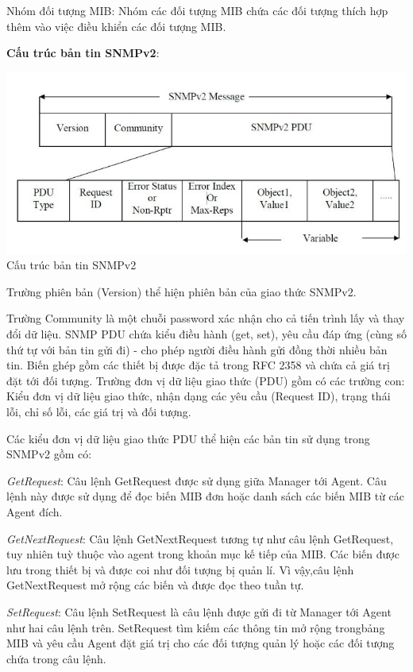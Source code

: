 \documentclass[12pt,oneside,a4paper,reqno]{report}
\begin{document}
\begin{large}
Nhóm đối tượng MIB: Nhóm các đối tượng MIB chứa các đối tượng thích hợp thêm vào việc điều khiển các đối tượng MIB. 

\newpage

\textbf{Cấu trúc bản tin SNMPv2}: 

\begin{center}
	\includegraphics[scale=0.7]{images/snmpv2.jpg}\\
	Cấu trúc bản tin SNMPv2
\end{center}

Trường phiên bản (Version) thể hiện phiên bản của giao thức SNMPv2. 

Trường Community là một chuỗi password xác nhận cho cả tiến trình lấy và thay đổi dữ liệu. SNMP PDU chứa kiểu điều hành (get, set), yêu cầu đáp ứng (cùng số thứ tự với bản tin gửi đi) - cho phép người điều hành gửi đồng thời nhiều bản tin. Biến ghép gồm các thiết bị được đặc tả trong RFC 2358 và chứa cả giá trị đặt tới đối tượng. Trường đơn vị dữ liệu giao thức (PDU) gồm có các trường con: Kiểu đơn vị dữ liệu giao thức, nhận dạng các yêu cầu (Request ID), trạng thái lỗi, chỉ số lỗi, các giá trị và đối tượng. 

Các kiểu đơn vị dữ liệu giao thức PDU thể hiện các bản tin sử dụng trong SNMPv2 gồm có: 

\textit{GetRequest}: Câu lệnh GetRequest được sử dụng giữa Manager tới Agent. Câu lệnh này được sử dụng để đọc biến MIB đơn hoặc danh sách các biến MIB từ các Agent đích.

\textit{GetNextRequest}: Câu lệnh GetNextRequest tương tự như câu lệnh GetRequest, tuy nhiên tuỳ thuộc vào agent trong khoản mục kế tiếp của MIB. Các biến được lưu trong thiết bị và được coi như đối tượng bị quản lí. Vì vậy,câu lệnh GetNextRequest mở rộng các biến và được đọc theo tuần tự. 

\textit{SetRequest}: Câu lệnh SetRequest là câu lệnh được gửi đi từ Manager tới Agent như hai câu lệnh trên. SetRequest tìm kiếm các thông tin mở rộng trongbảng MIB và yêu cầu Agent đặt giá trị cho các đối tượng quản lý hoặc các đối tượng chứa trong câu lệnh. 


\end{large}
\end{document}
